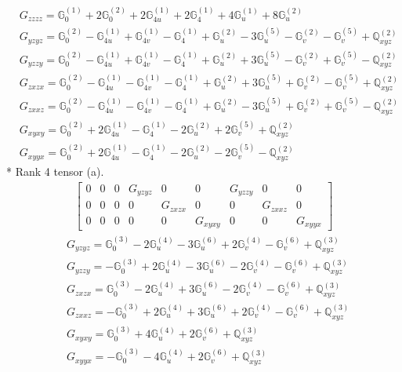 \documentclass[fleqn,8pt,landscape]{jsarticle}
\begin{document}
\begin{align*}
& G_{zzzz} = \mathbb{G}_{0}^{(1)} + 2 \mathbb{G}_{0}^{(2)} + 2 \mathbb{G}_{4u}^{(1)} + 2 \mathbb{G}_{4}^{(1)} + 4 \mathbb{G}_{u}^{(1)} + 8 \mathbb{G}_{u}^{(2)} \\
& G_{yzyz} = \mathbb{G}_{0}^{(2)} - \mathbb{G}_{4u}^{(1)} + \mathbb{G}_{4v}^{(1)} - \mathbb{G}_{4}^{(1)} + \mathbb{G}_{u}^{(2)} - 3 \mathbb{G}_{u}^{(5)} - \mathbb{G}_{v}^{(2)} - \mathbb{G}_{v}^{(5)} + \mathbb{Q}_{xyz}^{(2)} \\
& G_{yzzy} = \mathbb{G}_{0}^{(2)} - \mathbb{G}_{4u}^{(1)} + \mathbb{G}_{4v}^{(1)} - \mathbb{G}_{4}^{(1)} + \mathbb{G}_{u}^{(2)} + 3 \mathbb{G}_{u}^{(5)} - \mathbb{G}_{v}^{(2)} + \mathbb{G}_{v}^{(5)} - \mathbb{Q}_{xyz}^{(2)} \\
& G_{zxzx} = \mathbb{G}_{0}^{(2)} - \mathbb{G}_{4u}^{(1)} - \mathbb{G}_{4v}^{(1)} - \mathbb{G}_{4}^{(1)} + \mathbb{G}_{u}^{(2)} + 3 \mathbb{G}_{u}^{(5)} + \mathbb{G}_{v}^{(2)} - \mathbb{G}_{v}^{(5)} + \mathbb{Q}_{xyz}^{(2)} \\
& G_{zxxz} = \mathbb{G}_{0}^{(2)} - \mathbb{G}_{4u}^{(1)} - \mathbb{G}_{4v}^{(1)} - \mathbb{G}_{4}^{(1)} + \mathbb{G}_{u}^{(2)} - 3 \mathbb{G}_{u}^{(5)} + \mathbb{G}_{v}^{(2)} + \mathbb{G}_{v}^{(5)} - \mathbb{Q}_{xyz}^{(2)} \\
& G_{xyxy} = \mathbb{G}_{0}^{(2)} + 2 \mathbb{G}_{4u}^{(1)} - \mathbb{G}_{4}^{(1)} - 2 \mathbb{G}_{u}^{(2)} + 2 \mathbb{G}_{v}^{(5)} + \mathbb{Q}_{xyz}^{(2)} \\
& G_{xyyx} = \mathbb{G}_{0}^{(2)} + 2 \mathbb{G}_{4u}^{(1)} - \mathbb{G}_{4}^{(1)} - 2 \mathbb{G}_{u}^{(2)} - 2 \mathbb{G}_{v}^{(5)} - \mathbb{Q}_{xyz}^{(2)}
\end{align*}
* Rank 4 tensor (a).
\begin{align*}
\begin{bmatrix} 0 & 0 & 0 & G_{yzyz} & 0 & 0 & G_{yzzy} & 0 & 0 \\ 0 & 0 & 0 & 0 & G_{zxzx} & 0 & 0 & G_{zxxz} & 0 \\ 0 & 0 & 0 & 0 & 0 & G_{xyxy} & 0 & 0 & G_{xyyx} \end{bmatrix}
\end{align*}
\begin{align*}
& G_{yzyz} = \mathbb{G}_{0}^{(3)} - 2 \mathbb{G}_{u}^{(4)} - 3 \mathbb{G}_{u}^{(6)} + 2 \mathbb{G}_{v}^{(4)} - \mathbb{G}_{v}^{(6)} + \mathbb{Q}_{xyz}^{(3)} \\
& G_{yzzy} = - \mathbb{G}_{0}^{(3)} + 2 \mathbb{G}_{u}^{(4)} - 3 \mathbb{G}_{u}^{(6)} - 2 \mathbb{G}_{v}^{(4)} - \mathbb{G}_{v}^{(6)} + \mathbb{Q}_{xyz}^{(3)} \\
& G_{zxzx} = \mathbb{G}_{0}^{(3)} - 2 \mathbb{G}_{u}^{(4)} + 3 \mathbb{G}_{u}^{(6)} - 2 \mathbb{G}_{v}^{(4)} - \mathbb{G}_{v}^{(6)} + \mathbb{Q}_{xyz}^{(3)} \\
& G_{zxxz} = - \mathbb{G}_{0}^{(3)} + 2 \mathbb{G}_{u}^{(4)} + 3 \mathbb{G}_{u}^{(6)} + 2 \mathbb{G}_{v}^{(4)} - \mathbb{G}_{v}^{(6)} + \mathbb{Q}_{xyz}^{(3)} \\
& G_{xyxy} = \mathbb{G}_{0}^{(3)} + 4 \mathbb{G}_{u}^{(4)} + 2 \mathbb{G}_{v}^{(6)} + \mathbb{Q}_{xyz}^{(3)} \\
& G_{xyyx} = - \mathbb{G}_{0}^{(3)} - 4 \mathbb{G}_{u}^{(4)} + 2 \mathbb{G}_{v}^{(6)} + \mathbb{Q}_{xyz}^{(3)}
\end{align*}
\end{document}
